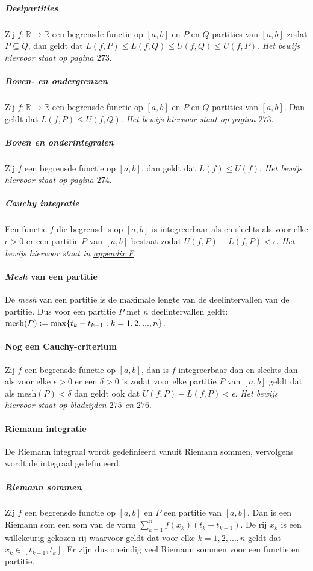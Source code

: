 \subparagraph{Deelpartities} Zij $f:\mathbb{R}\to\mathbb{R}$ een begrensde functie op $[a,b]$ en $P$ en $Q$ partities van $[a,b]$ zodat $P\subseteq Q$, dan geldt dat $L(f,P)\leq L(f,Q)\leq U(f,Q)\leq U(f,P)$. \textit{Het bewijs hiervoor staat op pagina $273$}.

\subparagraph{Boven- en ondergrenzen} Zij $f:\mathbb{R}\to\mathbb{R}$ een begrensde functie op $[a,b]$ en $P$ en $Q$ partities van $[a,b]$. Dan geldt dat $L(f,P)\leq U(f,Q)$. \textit{Het bewijs hiervoor staat op pagina $273$}.

\subparagraph{Boven en onderintegralen} Zij $f$ een begrensde functie op $[a,b]$, dan geldt dat $L(f)\leq U(f)$. \textit{Het bewijs hiervoor staat op pagina $274$}.

\subparagraph{Cauchy integratie} Een functie $f$ die begrensd is op $[a,b]$ is integreerbaar als en slechts als voor elke $\epsilon>0$ er een partitie $P$ van $[a,b]$ bestaat zodat $U(f,P)-L(f,P)<\epsilon$. \textit{Het bewijs hiervoor staat in \hyperref[sec:AF]{appendix F}}.

\paragraph{\textit{Mesh} van een partitie} De \textit{mesh} van een partitie is de maximale lengte van de deelintervallen van de partitie. Dus voor een partitie $P$ met $n$ deelintervallen geldt: $\text{mesh}(P)\vcentcolon=\text{max}\{t_{k}-t_{k-1}:k=1,2,...,n\}$.

\paragraph{Nog een Cauchy-criterium} Zij $f$ een begrensde functie op $[a,b]$, dan is $f$ integreerbaar dan en slechts dan als voor elke $\epsilon>0$ er een $\delta>0$ is zodat voor elke partitie $P$ van $[a,b]$ geldt dat als $\text{mesh}(P)<\delta$ dan geldt ook dat $U(f,P)-L(f,P)<\epsilon$. \textit{Het bewijs hiervoor staat op bladzijden $275$ en $276$}.

\paragraph{Riemann integratie} De Riemann integraal wordt gedefinieerd vanuit Riemann sommen, vervolgens wordt de integraal gedefinieerd.

\subparagraph{Riemann sommen} Zij $f$ een begrensde functie op $[a,b]$ en $P$ een partitie van $[a,b]$. Dan is een Riemann som een som van de vorm $\sum\limits_{k=1}^{n}f(x_{k})(t_{k}-t_{k-1})$. De rij $x_{k}$ is een willekeurig gekozen rij waarvoor geldt dat voor elke $k=1,2,...,n$ geldt dat $x_{k}\in[t_{k-1},t_{k}]$. Er zijn dus oneindig veel Riemann sommen voor een functie en partitie.

